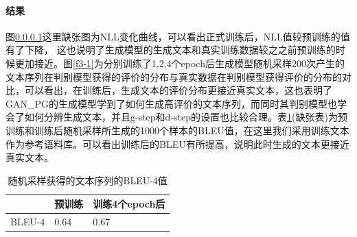 \documentclass[]{template}
\begin{document}
\paragraph{结果}
图\ref{}这里缺张图为NLL变化曲线，可以看出正式训练后，NLL值较预训练的值有了下降， 这也说明了生成模型的生成文本和真实训练数据较之之前预训练的时候更加接近。图\ref{f3-1}为分别训练了1,2,4个epoch后生成模型随机采样200次产生的文本序列在判别模型获得的评价的分布与真实数据在判别模型获得评价的分布的对比，可以看出，在训练后，生成文本的评价分布更接近真实文本，这也表明了GAN\_PG的生成模型学到了如何生成高评价的文本序列，而同时其判别模型也学会了如何分辨生成文本，并且g-step和d-step的设置也比较合理。表\ref{t3-5}(缺张表)为预训练和训练后随机采样所生成的1000个样本的BLEU值，在这里我们采用训练文本作为参考语料库。可以看出训练后的BLEU有所提高，说明此时生成的文本更接近真实文本。
\begin{table}[htb]\label{t3-5}
    \center
    \caption{\label{t3-5}随机采样获得的文本序列的BLEU-4值}
    \begin{tabular*}{\linewidth}{p{.33\linewidth}p{.33\linewidth}p{.33\linewidth}}
\toprule
&预训练&训练4个epoch后\\
\midrule
BLEU-4&0.64&0.67\\
\bottomrule
    \end{tabular*}
\end{table}
\end{document}
